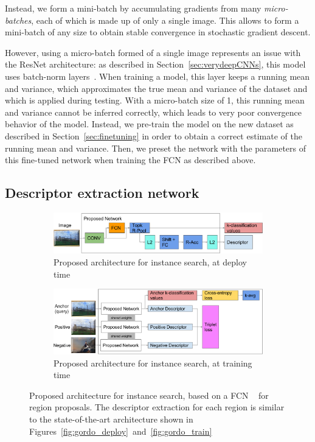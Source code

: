 Instead, we form a mini-batch by accumulating gradients from many
\emph{micro-batches}, each of which is made up of only a single image.
This allows to form a mini-batch of any size to obtain stable convergence
in stochastic gradient descent.

However, using a micro-batch formed of a single image represents an issue
with the ResNet architecture: as described in Section~\ref{sec:verydeepCNNs},
this model uses batch-norm layers~\cite{ioffe_batch_2015}.
When training a model, this layer keeps a running
mean and variance, which approximates the true mean and variance of the
dataset and which is applied during testing. With a micro-batch size
of 1, this running mean and variance cannot be inferred correctly,
which leads to very poor convergence behavior of the model.
Instead, we pre-train the model on the new
dataset as described in Section~\ref{sec:finetuning} in order to obtain
a correct estimate of the running mean and variance. Then, we preset the
network with the parameters of this fine-tuned network when training the
FCN as described above.

\subsection{Descriptor extraction network}
\begin{figure}
\begin{subfigure}{\textwidth}
\includegraphics[width=\textwidth]{img/contrib_deploy.png}
\caption{Proposed architecture for instance search, at deploy time
\label{fig:contribdeploy}}
\end{subfigure}

\begin{subfigure}{\textwidth}
\includegraphics[width=\textwidth]{img/contrib_train.png}
\caption{Proposed architecture for instance search, at training time
\label{fig:contribtrain}}
\end{subfigure}
\caption{Proposed architecture for instance search, based on a FCN
~\cite{long_fully_2015} for region proposals. The descriptor extraction
for each region is similar to the state-of-the-art architecture
shown in Figures~\ref{fig:gordo_deploy}~and~\ref{fig:gordo_train}
\label{fig:contrib}}
\end{figure}

